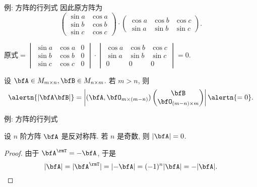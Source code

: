 \begin{frame}{例: 方阵的行列式}
	\onslide<+->
	因此原方阵为
	\[\begin{pmatrix}
			\sin a&\cos a\\
			\sin b&\cos b\\
			\sin c&\cos c
		\end{pmatrix}\cdot\begin{pmatrix}
			\cos a&\cos b&\cos c\\
			\sin a&\sin b&\sin c
		\end{pmatrix}.\]
	\onslide<+->
	\begin{solution}
		原式$=\begin{vmatrix}
			\sin a&\cos a&0\\
			\sin b&\cos b&0\\
			\sin c&\cos c&0
		\end{vmatrix}\cdot\begin{vmatrix}
			\cos a&\cos b&\cos c\\
			\sin a&\sin b&\sin c\\
			0&0&0
		\end{vmatrix}=0$.
	\end{solution}
	\onslide<+->
	设 $\bfA\in M_{m\times n},\bfB\in M_{n\times m}$.
	\onslide<+->
	若 $m>n$, 则
	\[\alertn{|\bfA\bfB|}=\left|
		(\bfA,\bfO_{m\times(m-n)})\begin{pmatrix}
		\bfB\\\bfO_{(m-n)\times m}
	\end{pmatrix}\right|\alertn{=0}.\]
\end{frame}


\begin{frame}{例: 方阵的行列式}
	\onslide<+->
	\begin{example}
		设 $n$ 阶方阵 $\bfA$ 是反对称阵.
		若 $n$ 是奇数, 则 $|\bfA|=0$.
	\end{example}
	\onslide<+->
	\begin{proof}
		由于 $\bfA^\rmT=-\bfA$, 于是
		\[|\bfA|=|\bfA^\rmT|=|{-\bfA}|=(-1)^n|\bfA|=-|\bfA|.\]
	\onslide<+->{%
			故 $|\bfA|=0$.\qedhere
		}
	\end{proof}
\end{frame}


